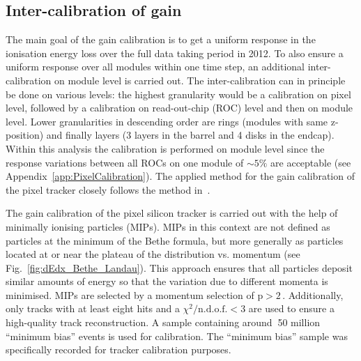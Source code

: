 \subsection*{Inter-calibration of gain}
The main goal of the gain calibration is to get a uniform response in the ionisation energy loss \dedx over the full data taking period in 2012.
To also ensure a uniform response over all modules within one time step, an additional inter-calibration on module level is carried out.
The inter-calibration can in principle be done on various levels: the highest granularity would be a calibration on pixel level, followed by a calibration on read-out-chip (ROC) level and then on module level.
Lower granularities in descending order are rings (modules with same z-position) and finally layers (3 layers in the barrel and 4 disks in the endcap). 
Within this analysis the calibration is performed on module level since the response variations between all ROCs on one module of $\sim5\%$ are acceptable (see Appendix~\ref{app:PixelCalibration}). 
The applied method for the gain calibration of the pixel tracker closely follows the method in~\cite{bib:Quertenmont_2010}.

The gain calibration of the pixel silicon tracker is carried out with the help of minimally ionising particles (MIPs).
MIPs in this context are not defined as particles at the minimum of the Bethe formula, but more generally as particles located at or near the plateau of the \dedx distribution vs. momentum (see Fig.~\ref{fig:dEdx_Bethe_Landau}).
This approach ensures that all particles deposit similar amounts of energy so that the variation due to different momenta is minimised.
MIPs are selected by a momentum selection of $\text{p}>2\,$\gev.
Additionally, only tracks with at least eight hits and a $\chi^2/\text{n.d.o.f.}<3$ are used to ensure a high-quality track reconstruction.
A sample containing around $~$50 million ``minimum bias'' events is used for calibration.
The ``minimum bias'' sample was specifically recorded for tracker calibration purposes.

